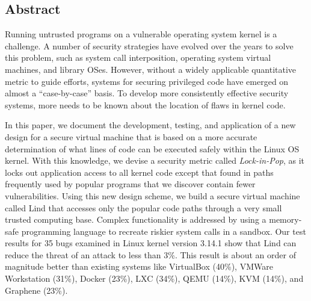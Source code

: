 \subsection*{Abstract}

Running untrusted programs on a vulnerable operating system kernel is a challenge.
A number of security strategies have evolved over the years to solve this problem,
such as system call interposition, operating system virtual machines, and library OSes.
However, without a widely applicable quantitative metric to guide efforts, systems
for securing privileged code
have emerged on almost a ``case-by-case'' basis. To develop more consistently
effective security systems,
more needs to be known about the location of flaws in kernel code.

In this paper, we document the development, testing, and application of a new
design for a secure virtual machine
that is based on a more accurate determination of what lines of code can be
executed safely within the Linux OS kernel.
With this knowledge, we devise a security metric called \emph{Lock-in-Pop},
as it locks out application access to all kernel code
except that found in paths frequently used by popular programs that we discover
contain fewer vulnerabilities.
Using this new design scheme, we build a secure virtual machine called Lind that accesses only
the popular code paths through a very small trusted computing base. Complex functionality is addressed
by using a memory-safe programming language to recreate riskier system calls in a sandbox.
Our test results for 35 bugs examined in Linux kernel version 3.14.1 show that Lind can
reduce the threat of an attack to less than 3\%.
This result is about an order of magnitude better than existing systems like VirtualBox (40\%), VMWare Workstation (31\%), Docker (23\%),
LXC (34\%), QEMU (14\%), KVM (14\%), and Graphene (23\%).
